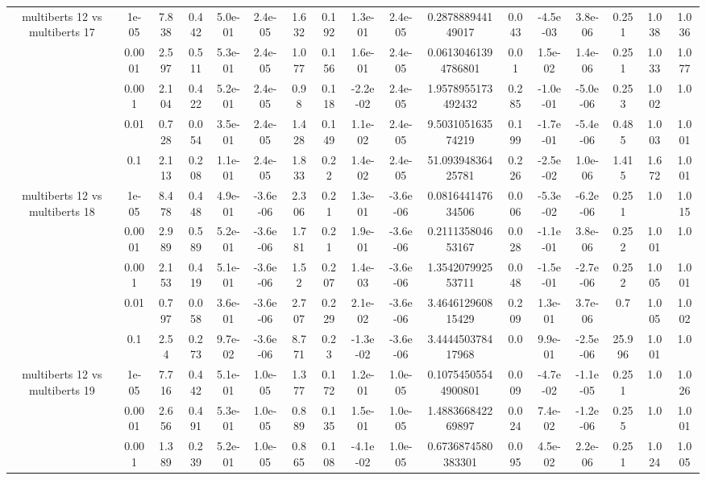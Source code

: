 \begin{tabular}{|c|c|c|c|c|c|c|c|c|c|c|c|c|c|c|c|c|}
\hline
\multirow{5}{*}{multiberts 12 vs multiberts 17} & 1e-05 & 7.838 & 0.442 & 5.0e-01 & 2.4e-05 & 1.632 & 0.192 & 1.3e-01 & 2.4e-05 & 0.287888944149017 & 0.043 & -4.5e-03 & 3.8e-06 & 0.251 & 1.038 & 1.036 \\
 & 0.0001 & 2.597 & 0.511 & 5.3e-01 & 2.4e-05 & 1.077 & 0.156 & 1.6e-01 & 2.4e-05 & 0.06130461394786801 & 0.01 & 1.5e-02 & 1.4e-06 & 0.251 & 1.033 & 1.077 \\
 & 0.001 & 2.104 & 0.422 & 5.2e-01 & 2.4e-05 & 0.98 & 0.118 & -2.2e-02 & 2.4e-05 & 1.9578955173492432 & 0.285 & -1.0e-01 & -5.0e-06 & 0.253 & 1.002 & 1.0 \\
 & 0.01 & 0.728 & 0.054 & 3.5e-01 & 2.4e-05 & 1.428 & 0.149 & 1.1e-02 & 2.4e-05 & 9.503105163574219 & 0.199 & -1.7e-01 & -5.4e-06 & 0.485 & 1.003 & 1.001 \\
 & 0.1 & 2.113 & 0.208 & 1.1e-01 & 2.4e-05 & 1.833 & 0.22 & 1.4e-02 & 2.4e-05 & 51.09394836425781 & 0.226 & -2.5e-02 & 1.0e-06 & 1.415 & 1.672 & 1.001 \\
\hline
\multirow{5}{*}{multiberts 12 vs multiberts 18} & 1e-05 & 8.478 & 0.448 & 4.9e-01 & -3.6e-06 & 2.306 & 0.21 & 1.3e-01 & -3.6e-06 & 0.081644147634506 & 0.006 & -5.3e-02 & -6.2e-06 & 0.251 & 1.0 & 1.015 \\
 & 0.0001 & 2.989 & 0.589 & 5.2e-01 & -3.6e-06 & 1.781 & 0.21 & 1.9e-01 & -3.6e-06 & 0.211135804653167 & 0.028 & -1.1e-01 & 3.8e-06 & 0.252 & 1.001 & 1.0 \\
 & 0.001 & 2.153 & 0.419 & 5.1e-01 & -3.6e-06 & 1.52 & 0.207 & 1.4e-03 & -3.6e-06 & 1.354207992553711 & 0.048 & -1.5e-01 & -2.7e-06 & 0.252 & 1.005 & 1.001 \\
 & 0.01 & 0.797 & 0.058 & 3.6e-01 & -3.6e-06 & 2.707 & 0.229 & 2.1e-02 & -3.6e-06 & 3.464612960815429 & 0.209 & 1.3e-01 & 3.7e-06 & 0.7 & 1.005 & 1.002 \\
 & 0.1 & 2.54 & 0.273 & 9.7e-02 & -3.6e-06 & 8.771 & 0.23 & -1.3e-02 & -3.6e-06 & 3.444450378417968 & 0.0 & 9.9e-01 & -2.5e-06 & 25.996 & 1.001 & 1.0 \\
\hline
\multirow{5}{*}{multiberts 12 vs multiberts 19} & 1e-05 & 7.716 & 0.442 & 5.1e-01 & 1.0e-05 & 1.377 & 0.172 & 1.2e-01 & 1.0e-05 & 0.10754505544900801 & 0.009 & -4.7e-02 & -1.1e-05 & 0.251 & 1.0 & 1.026 \\
 & 0.0001 & 2.656 & 0.491 & 5.3e-01 & 1.0e-05 & 0.889 & 0.135 & 1.5e-01 & 1.0e-05 & 1.488366842269897 & 0.024 & 7.4e-02 & -1.2e-06 & 0.255 & 1.0 & 1.001 \\
 & 0.001 & 1.389 & 0.239 & 5.2e-01 & 1.0e-05 & 0.865 & 0.108 & -4.1e-02 & 1.0e-05 & 0.6736874580383301 & 0.095 & 4.5e-02 & 2.2e-06 & 0.251 & 1.024 & 1.005 \\

\end{tabular}
